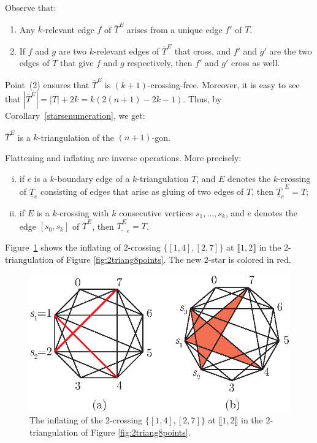 \documentclass[12pt]{amsart}
\begin{document}
Observe that:
\begin{enumerate}
\item Any $k$-relevant edge $f$ of $\overline{T}^E$ arises from a unique edge $f'$ of $T$.

\item If $f$ and $g$ are two $k$-relevant edges of $\overline{T}^E$ that cross, and $f'$ and $g'$ are the two edges of $T$ that give $f$ and $g$ respectively, then $f'$ and $g'$ cross as well.
\end{enumerate}

Point~(2) ensures that $\overline{T}^E$ is $(k+1)$-crossing-free. Moreover, it is easy to see that $|\overline{T}^E|=|T|+2k=k(2(n+1)-2k-1)$. Thus, by Corollary~\ref{starsenumeration}, we get:

\begin{lemma}
$\overline{T}^E$ is a $k$-triangulation of the $(n+1)$-gon.
\end{lemma}

\begin{theorem}
Flattening and inflating are inverse operations. More precisely:
\begin{enumerate}[(i)]
\item if $e$ is a $k$-boundary edge of a $k$-triangulation $T$, and $E$ denotes the $k$-crossing of $\underline{T}_e$ consisting of edges that arise as gluing of two edges of $T$, then $\overline{\underline{T}_e}^E=T$;
\item if $E$ is a $k$-crossing with $k$ consecutive vertices $s_1,\ldots,s_k$, and $e$ denotes the edge $[s_0,s_k]$ of $\overline{T}^E$, then $\underline{\overline{T}^E}_e=T$.
\end{enumerate}
\end{theorem}

\begin{example}
\rm
Figure~\ref{fig:2triang8pointsinflat} shows the inflating of $2$-crossing $\{[1,4],[2,7]\}$ at $\llbracket 1,2\rrbracket$ in the $2$-triangulation of Figure \ref{fig:2triang8points}. The new $2$-star is colored in red.
\end{example}

\begin{figure}
\centerline{\includegraphics[scale=1]{2triang8pointsinflat.eps}}
\caption{\small{The inflating of the $2$-crossing $\{[1,4],[2,7]\}$ at $\llbracket 1,2\rrbracket$ in the $2$-triangulation of Figure \ref{fig:2triang8points}.}}\label{fig:2triang8pointsinflat}
\end{figure}
\end{document}
